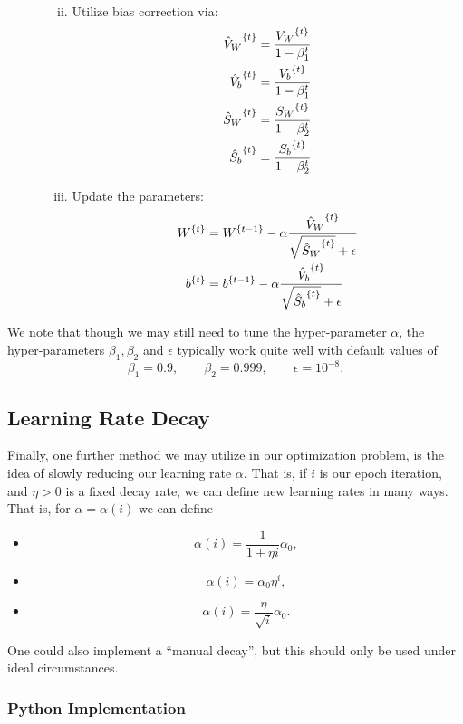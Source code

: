 \begin{enumerate}
\begin{enumerate}[a.]
\begin{enumerate}[i.]
\begin{align*}
			\end{align*}
			\item Utilize bias correction via:
			\begin{align*}
				{\hat{V}_W}^{\{{t}\}}&=\frac{{V_W}^{\{{t}\}}}{1-\beta_1^t}\\
				{\hat{V}_b}^{\{{t}\}}&=\frac{{V_b}^{\{{t}\}}}{1-\beta_1^t}\\
				{\hat{S}_W}^{\{{t}\}}&=\frac{{S_W}^{\{{t}\}}}{1-\beta_2^t}\\
				{\hat{S}_b}^{\{{t}\}}&=\frac{{S_b}^{\{{t}\}}}{1-\beta_2^t}
			\end{align*}
			\item Update the parameters:
			\begin{align*}
				{W}^{\{{t}\}}&={W}^{\{{t-1}\}}-\alpha\frac{{\hat{V}_W}^{\{{t}\}}}{\sqrt{{\hat{S}_W}^{\{{t}\}}}+\epsilon}\\
				{b}^{\{{t}\}}&={b}^{\{{t-1}\}}-\alpha\frac{{\hat{V}_b}^{\{{t}\}}}{\sqrt{{\hat{S}_b}^{\{{t}\}}}+\epsilon}
			\end{align*}
		\end{enumerate}
	\end{enumerate}
\end{enumerate}

We note that though we may still need to tune the hyper-parameter $\alpha$, the hyper-parameters $\beta_1,\beta_2$ and $\epsilon$ typically work quite well with default values of
$$\beta_1=0.9,\qquad\beta_2=0.999,\qquad\epsilon=10^{-8}.$$



\subsection{Learning Rate Decay}

Finally, one further method we may utilize in our optimization problem, is the idea of slowly reducing our learning rate $\alpha$.  That is, if $i$ is our epoch iteration, and $\eta>0$ is a fixed decay rate, we can define new learning rates in many ways.  That is, for $\alpha=\alpha(i)$ we can define
\begin{itemize}
	\item $$\alpha(i)=\frac{1}{1+\eta i}\alpha_0,$$
	\item $$\alpha(i)=\alpha_0\eta^i,$$
	\item $$\alpha(i)=\frac{\eta}{\sqrt{i}}\alpha_0.$$
\end{itemize}
One could also implement a ``manual decay'', but this should only be used under ideal circumstances.



\subsubsection{Python Implementation}







